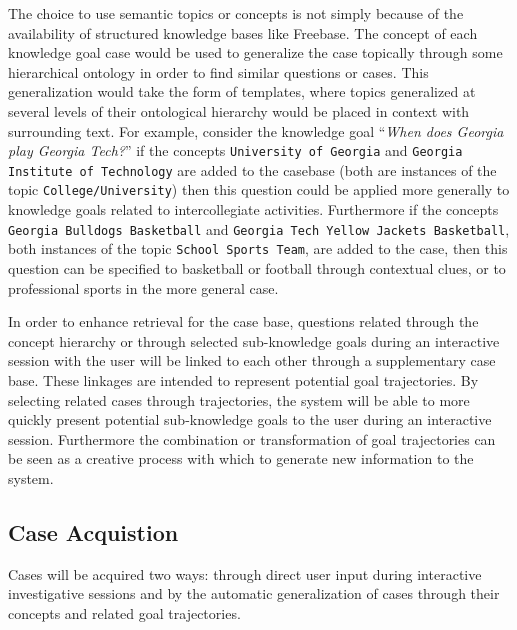 \documentclass{llncs}
\begin{document}
The choice to use semantic topics or concepts is not simply because of the availability of structured knowledge bases like Freebase. The concept of each knowledge goal case would be used to generalize the case topically through some hierarchical ontology in order to find similar questions or cases. This generalization would take the form of templates, where topics generalized at several levels of their ontological hierarchy would be placed in context with surrounding text. For example, consider the knowledge goal ``\textit{When does Georgia play Georgia Tech?}'' if the concepts \texttt{University of Georgia} and \texttt{Georgia Institute of Technology} are added to the casebase (both are instances of the topic \texttt{College/University}) then this question could be applied more generally to knowledge goals related to intercollegiate activities. Furthermore if the concepts \texttt{Georgia Bulldogs Basketball} and \texttt{Georgia Tech Yellow Jackets Basketball}, both instances of the topic \texttt{School Sports Team}, are added to the case, then this question can be specified to basketball or football through contextual clues, or to professional sports in the more general case.

In order to enhance retrieval for the case base, questions related through the concept hierarchy or through selected sub-knowledge goals during an interactive session with the user will be linked to each other through a supplementary case base. These linkages are intended to represent potential goal trajectories. By selecting related cases through trajectories, the system will be able to more quickly present potential sub-knowledge goals to the user during an interactive session. Furthermore the combination or transformation of goal trajectories can be seen as a creative process with which to generate new information to the system.

\subsection{Case Acquistion}

Cases will be acquired two ways: through direct user input during interactive investigative sessions and by the automatic generalization of cases through their concepts and related goal trajectories.
\end{document}
